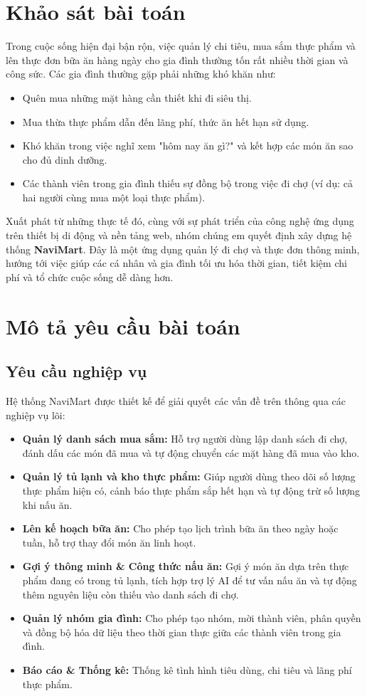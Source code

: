 \documentclass[../main.tex]{subfiles}
\begin{document}
\section{Khảo sát bài toán}
Trong cuộc sống hiện đại bận rộn, việc quản lý chi tiêu, mua sắm thực phẩm và lên thực đơn bữa ăn hàng ngày cho gia đình thường tốn rất nhiều thời gian và công sức. Các gia đình thường gặp phải những khó khăn như:
\begin{itemize}
    \item Quên mua những mặt hàng cần thiết khi đi siêu thị.
    \item Mua thừa thực phẩm dẫn đến lãng phí, thức ăn hết hạn sử dụng.
    \item Khó khăn trong việc nghĩ xem "hôm nay ăn gì?" và kết hợp các món ăn sao cho đủ dinh dưỡng.
    \item Các thành viên trong gia đình thiếu sự đồng bộ trong việc đi chợ (ví dụ: cả hai người cùng mua một loại thực phẩm).
\end{itemize}

Xuất phát từ những thực tế đó, cùng với sự phát triển của công nghệ ứng dụng trên thiết bị di động và nền tảng web, nhóm chúng em quyết định xây dựng hệ thống \textbf{NaviMart}. Đây là một ứng dụng quản lý đi chợ và thực đơn thông minh, hướng tới việc giúp các cá nhân và gia đình tối ưu hóa thời gian, tiết kiệm chi phí và tổ chức cuộc sống dễ dàng hơn.

\section{Mô tả yêu cầu bài toán}

\subsection{Yêu cầu nghiệp vụ}
Hệ thống NaviMart được thiết kế để giải quyết các vấn đề trên thông qua các nghiệp vụ lõi:
\begin{itemize}
    \item \textbf{Quản lý danh sách mua sắm:} Hỗ trợ người dùng lập danh sách đi chợ, đánh dấu các món đã mua và tự động chuyển các mặt hàng đã mua vào kho.
    \item \textbf{Quản lý tủ lạnh và kho thực phẩm:} Giúp người dùng theo dõi số lượng thực phẩm hiện có, cảnh báo thực phẩm sắp hết hạn và tự động trừ số lượng khi nấu ăn.
    \item \textbf{Lên kế hoạch bữa ăn:} Cho phép tạo lịch trình bữa ăn theo ngày hoặc tuần, hỗ trợ thay đổi món ăn linh hoạt.
    \item \textbf{Gợi ý thông minh \& Công thức nấu ăn:} Gợi ý món ăn dựa trên thực phẩm đang có trong tủ lạnh, tích hợp trợ lý AI để tư vấn nấu ăn và tự động thêm nguyên liệu còn thiếu vào danh sách đi chợ.
    \item \textbf{Quản lý nhóm gia đình:} Cho phép tạo nhóm, mời thành viên, phân quyền và đồng bộ hóa dữ liệu theo thời gian thực giữa các thành viên trong gia đình.
    \item \textbf{Báo cáo \& Thống kê:} Thống kê tình hình tiêu dùng, chi tiêu và lãng phí thực phẩm.
\end{itemize}
\end{document}
